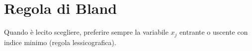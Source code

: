 \documentclass[\main/main.tex]{subfiles}
\begin{document}
\section{Regola di Bland}
\begin{theorem}
  Quando è lecito scegliere, preferire sempre la variabile $x_j$ entrante o uscente con indice minimo (regola lessicografica).
\end{theorem}
\end{document}

